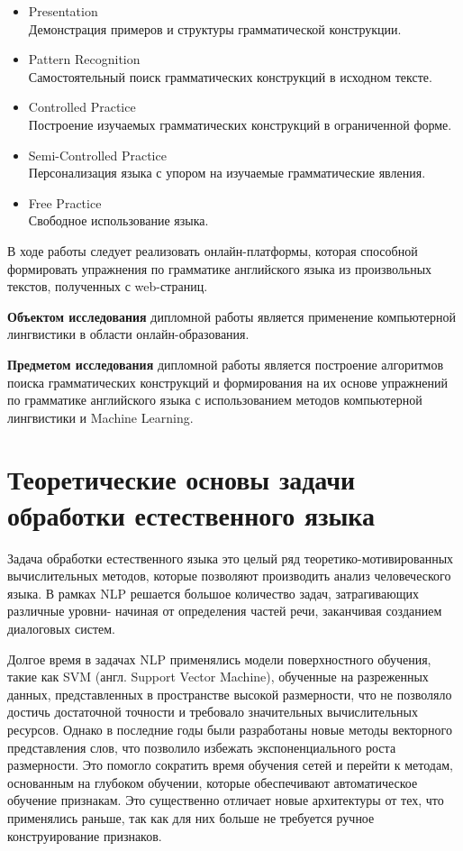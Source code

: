 \begin{itemize}
  \item Presentation \\ Демонстрация примеров и структуры грамматической конструкции.
  \item Pattern Recognition\\Самостоятельный поиск грамматических конструкций в исходном тексте.
 \item Controlled Practice\\Построение изучаемых грамматических конструкций в ограниченной форме.
 \item Semi-Controlled Practice\\Персонализация языка с упором на изучаемые грамматические явления.
 \item Free Practice\\Свободное использование языка.
\end{itemize}

В ходе работы следует реализовать онлайн-платформы, которая способной формировать упражнения по грамматике английского языка из произвольных текстов, полученных с web-страниц.

\textbf{Объектом исследования} дипломной работы является применение компьютерной лингвистики в области онлайн-образования.

\textbf{Предметом исследования} дипломной работы является построение алгоритмов поиска грамматических конструкций и формирования на их основе упражнений по грамматике английского языка с использованием методов компьютерной лингвистики и Machine Learning.

\newpage
\section{Теоретические основы задачи обработки естественного языка}
\label{sec:theory}

Задача обработки естественного языка это целый ряд теоретико-мотивированных вычислительных методов, которые позволяют производить анализ человеческого языка. В рамках NLP решается большое количество задач, затрагивающих различные уровни- начиная от определения частей речи, заканчивая созданием диалоговых систем.

Долгое время в задачах NLP применялись модели поверхностного обучения, такие как SVM (англ. Support Vector Machine), обученные на разреженных данных, представленных в пространстве высокой размерности, что не позволяло достичь достаточной точности и требовало значительных вычислительных ресурсов. Однако в последние годы были разработаны новые методы векторного представления слов, что позволило избежать экспоненциального роста размерности. Это помогло сократить время обучения сетей и перейти к методам, основанным на глубоком обучении, которые обеспечивают автоматическое обучение признакам. Это существенно отличает новые архитектуры от тех, что применялись раньше, так как для них больше не требуется ручное конструирование признаков.

